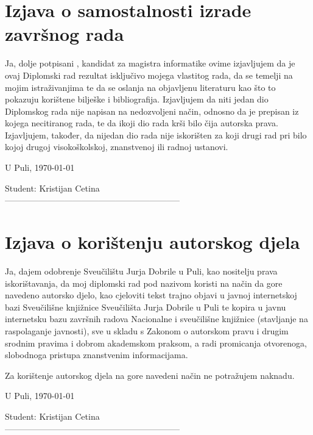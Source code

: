 \chapter*{Izjava o samostalnosti izrade završnog rada}

Ja, dolje potpisani \authorName, kandidat za magistra informatike ovime izjavljujem da je ovaj Diplomski rad rezultat isključivo mojega vlastitog rada, da se temelji na mojim istraživanjima te da se oslanja na objavljenu literaturu kao što to pokazuju korištene bilješke i bibliografija.
Izjavljujem da niti jedan dio Diplomskog rada nije napisan na nedozvoljeni način, odnosno da je prepisan iz kojega necitiranog rada, te da ikoji dio rada krši bilo čija autorska prava.
Izjavljujem, također, da nijedan dio rada nije iskorišten za koji drugi rad pri bilo kojoj drugoj 
visokoškolskoj, znanstvenoj ili radnoj ustanovi.

\vspace{2 cm}
U Puli, \today

\vspace{\fill}
\begin{flushright}
Student: Kristijan Cetina\\
\vspace{15mm}
--------------------------------------------------------------
\end{flushright}

\pagebreak

\chapter*{Izjava o korištenju autorskog djela}

Ja, \authorName dajem odobrenje Sveučilištu Jurja Dobrile u Puli, kao nositelju prava iskorištavanja, da moj diplomski rad pod nazivom \naslovRada koristi na način da gore navedeno autorsko djelo, kao cjeloviti tekst trajno objavi u javnoj internetskoj bazi Sveučilišne knjižnice Sveučilišta Jurja Dobrile u Puli te kopira u javnu internetsku bazu završnih radova Nacionalne i sveučilišne knjižnice (stavljanje na raspolaganje javnosti), sve u skladu s Zakonom o autorskom pravu i drugim srodnim pravima i dobrom akademskom praksom, a radi promicanja otvorenoga, slobodnoga pristupa znanstvenim informacijama. 

Za korištenje autorskog djela na gore navedeni način ne potražujem naknadu.

\vspace{2 cm}
U Puli, \today

\vspace{\fill}
\begin{flushright}
Student: Kristijan Cetina\\
\vspace{15mm}
--------------------------------------------------------------
\end{flushright}